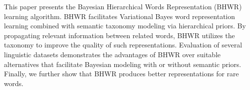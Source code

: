 This paper presents the Bayesian Hierarchical Words Representation (BHWR) learning algorithm. BHWR facilitates Variational Bayes word representation learning combined with semantic taxonomy modeling via hierarchical priors. By propagating relevant information between related words, BHWR utilizes the taxonomy to improve the quality of such representations. Evaluation of several linguistic datasets demonstrates the advantages of BHWR over suitable alternatives that facilitate Bayesian modeling with or without semantic priors. Finally, we further show that BHWR produces better representations for rare words.
